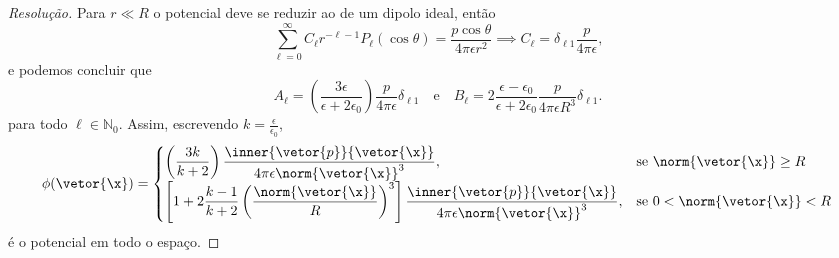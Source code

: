 \begin{proof}[Resolução]
    Para \(r \ll R\) o potencial deve se reduzir ao de um dipolo ideal, então
    \begin{equation*}
        \sum_{\ell = 0}^\infty C_\ell r^{-\ell - 1}P_\ell(\cos\theta) = \frac{p \cos\theta}{4\pi \epsilon r^2} \implies C_\ell = \delta_{\ell 1} \frac{p}{4\pi \epsilon},
    \end{equation*}
    e podemos concluir que
    \begin{equation*}
        A_\ell = \left(\frac{3 \epsilon}{\epsilon + 2\epsilon_0}\right) \frac{p}{4\pi \epsilon}\delta_{\ell 1}  \quad\text{e}\quad
        B_\ell = 2\frac{\epsilon - \epsilon_0}{\epsilon + 2\epsilon_0 } \frac{p}{4\pi \epsilon R^{3}} \delta_{\ell 1}.
    \end{equation*}
    para todo \(\ell \in \mathbb{N}_0\). Assim, escrevendo \(k = \frac{\epsilon}{\epsilon_0}\),
    \begin{equation*}
        \phi(\vetor{\x}) = \begin{cases}
            \displaystyle \left(\frac{3 k}{k + 2}\right) \frac{\inner{\vetor{p}}{\vetor{\x}}}{4\pi \epsilon \norm{\vetor{\x}}^3},&\text{se }\norm{\vetor{\x}} \geq R\\
            \displaystyle \left[1 + 2\frac{k - 1}{k + 2}\left(\frac{\norm{\vetor{\x}}}{R}\right)^3\right]\frac{\inner{\vetor{p}}{\vetor{\x}}}{4\pi \epsilon\norm{\vetor{\x}}^3},&\text{se }0 < \norm{\vetor{\x}} < R
        \end{cases}
    \end{equation*}
    é o potencial em todo o espaço.


\end{proof}
